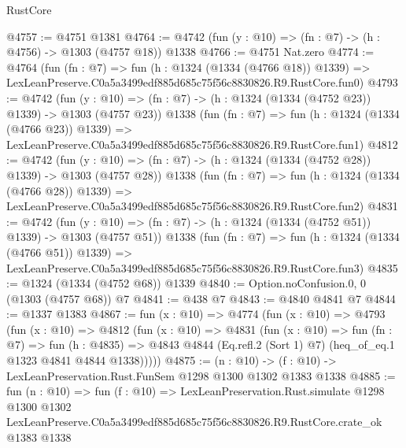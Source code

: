 \begin{lexlean}{RustCore}
\begin{coremodule}
@4757 := @4751 @1381
@4764 := @4742 (fun (y : @10) => (fn : @7) -> (h : @4756) -> @1303 (@4757 @18)) @1338
@4766 := @4751 Nat.zero
@4774 := @4764
    (fun (fn : @7) =>
    fun (h : @1324 (@1334 (@4766 @18)) @1339) =>
    LexLeanPreserve.C0a5a3499edf885d685c75f56c8830826.R9.RustCore.fun0)
@4793 := @4742
    (fun (y : @10) => (fn : @7) -> (h : @1324 (@1334 (@4752 @23)) @1339) -> @1303 (@4757 @23))
    @1338
    (fun (fn : @7) =>
    fun (h : @1324 (@1334 (@4766 @23)) @1339) =>
    LexLeanPreserve.C0a5a3499edf885d685c75f56c8830826.R9.RustCore.fun1)
@4812 := @4742
    (fun (y : @10) => (fn : @7) -> (h : @1324 (@1334 (@4752 @28)) @1339) -> @1303 (@4757 @28))
    @1338
    (fun (fn : @7) =>
    fun (h : @1324 (@1334 (@4766 @28)) @1339) =>
    LexLeanPreserve.C0a5a3499edf885d685c75f56c8830826.R9.RustCore.fun2)
@4831 := @4742
    (fun (y : @10) => (fn : @7) -> (h : @1324 (@1334 (@4752 @51)) @1339) -> @1303 (@4757 @51))
    @1338
    (fun (fn : @7) =>
    fun (h : @1324 (@1334 (@4766 @51)) @1339) =>
    LexLeanPreserve.C0a5a3499edf885d685c75f56c8830826.R9.RustCore.fun3)
@4835 := @1324 (@1334 (@4752 @68)) @1339
@4840 := Option.noConfusion.{0, 0} (@1303 (@4757 @68)) @7
@4841 := @438 @7
@4843 := @4840 @4841 @7
@4844 := @1337 @1383
@4867 := fun (x : @10) =>
  @4774
    (fun (x : @10) =>
    @4793
      (fun (x : @10) =>
      @4812
        (fun (x : @10) =>
        @4831
          (fun (x : @10) =>
          fun (fn : @7) =>
          fun (h : @4835) =>
          @4843 @4844 (Eq.refl.{2} (Sort 1) @7) (heq_of_eq.{1} @1323 @4841 @4844 @1338)))))
@4875 := (n : @10) -> (f : @10) -> LexLeanPreservation.Rust.FunSem @1298 @1300 @1302 @1383 @1338
@4885 := fun (n : @10) =>
  fun (f : @10) =>
  LexLeanPreservation.Rust.simulate
    @1298
    @1300
    @1302
    LexLeanPreserve.C0a5a3499edf885d685c75f56c8830826.R9.RustCore.crate_ok
    @1383
    @1338
\end{coremodule}
\end{lexlean}
